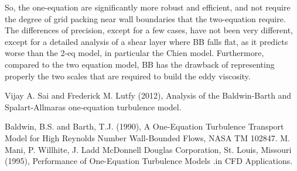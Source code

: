 \documentclass{article}
\begin{document}
So, the one-equation are significantly more robust and efficient, and not require the degree of grid packing near wall boundaries that the two-equation require.
The differences of precision, except for a few cases, have not been very different, except for a detailed analysis of a shear layer where BB falls flat, as it predicts worse than the 2-eq model, in particular the Chien model.
Furthermore, compared to the two equation model, BB has the drawback of representing properly the two scales that are required to build the eddy viscosity.
\newpage
\begin{thebibliography}{}

\bibitem{}Vijay A. Sai and Frederick M. Lutfy (2012), Analysis of the Baldwin-Barth and Spalart-Allmaras one-equation turbulence model.

\bibitem{} Baldwin, B.S. and Barth, T.J. (1990), A One-Equation Turbulence Transport Model for High Reynolds Number Wall-Bounded Flows, NASA TM 102847.
\bibitem{}  M. Mani, P. Willhite, J. Ladd McDonnell Douglas Corporation, St. Louis, Missouri (1995), Performance of One-Equation Turbulence Models .in CFD Applications.
\end{thebibliography}
\end{document}
